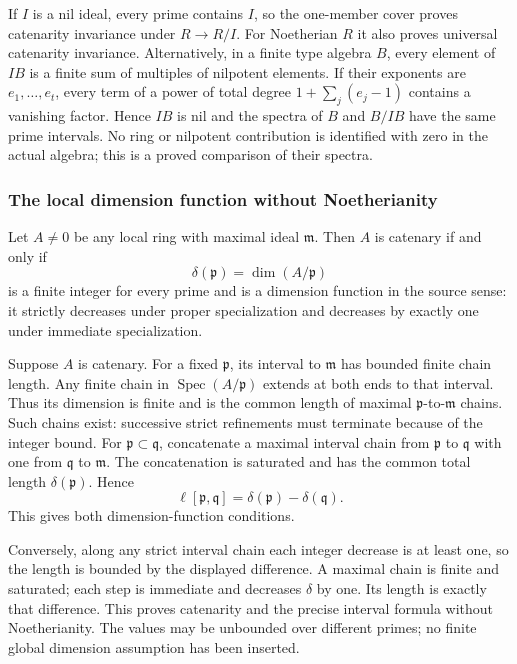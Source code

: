 If \(I\) is a nil ideal, every prime contains \(I\), so the one-member cover proves catenarity invariance under \(R\to R/I\). For Noetherian \(R\) it also proves universal catenarity invariance. Alternatively, in a finite type algebra \(B\), every element of \(IB\) is a finite sum of multiples of nilpotent elements. If their exponents are \(e_1,\ldots,e_t\), every term of a power of total degree \(1+\sum_j(e_j-1)\) contains a vanishing factor. Hence \(IB\) is nil and the spectra of \(B\) and \(B/IB\) have the same prime intervals. No ring or nilpotent contribution is identified with zero in the actual algebra; this is a proved comparison of their spectra.

\subsubsection{The local dimension function without Noetherianity}\label{algebra-proof-020-the-local-dimension-function-without-noetherianity}

Let \(A\ne0\) be any local ring with maximal ideal \(\mathfrak m\). Then \(A\) is catenary if and only if \[
 \delta(\mathfrak p)=\dim(A/\mathfrak p)
\] is a finite integer for every prime and is a dimension function in the source sense: it strictly decreases under proper specialization and decreases by exactly one under immediate specialization.

Suppose \(A\) is catenary. For a fixed \(\mathfrak p\), its interval to \(\mathfrak m\) has bounded finite chain length. Any finite chain in \(\operatorname{Spec}(A/\mathfrak p)\) extends at both ends to that interval. Thus its dimension is finite and is the common length of maximal \(\mathfrak p\)-to-\(\mathfrak m\) chains. Such chains exist: successive strict refinements must terminate because of the integer bound. For \(\mathfrak p\subset\mathfrak q\), concatenate a maximal interval chain from \(\mathfrak p\) to \(\mathfrak q\) with one from \(\mathfrak q\) to \(\mathfrak m\). The concatenation is saturated and has the common total length \(\delta(\mathfrak p)\). Hence \[
 \ell[\mathfrak p,\mathfrak q]
 =\delta(\mathfrak p)-\delta(\mathfrak q).
\] This gives both dimension-function conditions.

Conversely, along any strict interval chain each integer decrease is at least one, so the length is bounded by the displayed difference. A maximal chain is finite and saturated; each step is immediate and decreases \(\delta\) by one. Its length is exactly that difference. This proves catenarity and the precise interval formula without Noetherianity. The values may be unbounded over different primes; no finite global dimension assumption has been inserted.

